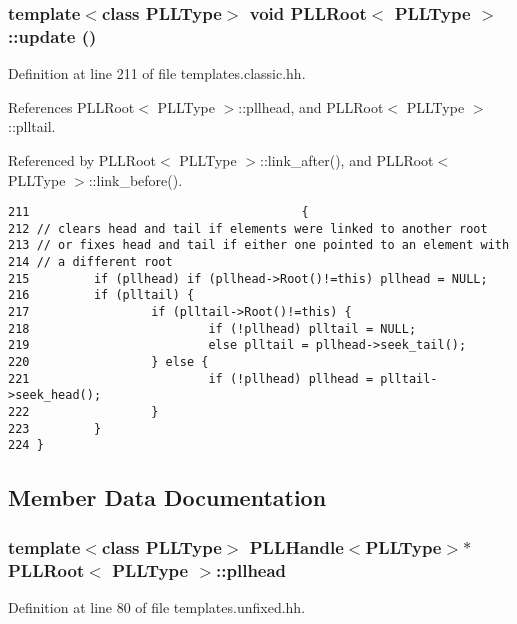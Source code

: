 \subsubsection{\setlength{\rightskip}{0pt plus 5cm}template$<$class PLLType$>$ void PLLRoot$<$ {\bf PLLType} $>$::update ()\hspace{0.3cm}{\tt  [inline]}}\label{classPLLRoot_a7}




Definition at line 211 of file templates.classic.hh.

References PLLRoot$<$ PLLType $>$::pllhead, and PLLRoot$<$ PLLType $>$::plltail.

Referenced by PLLRoot$<$ PLLType $>$::link\_\-after(), and PLLRoot$<$ PLLType $>$::link\_\-before().



\footnotesize\begin{verbatim}211                                      { 
212 // clears head and tail if elements were linked to another root
213 // or fixes head and tail if either one pointed to an element with
214 // a different root
215         if (pllhead) if (pllhead->Root()!=this) pllhead = NULL; 
216         if (plltail) { 
217                 if (plltail->Root()!=this) { 
218                         if (!pllhead) plltail = NULL; 
219                         else plltail = pllhead->seek_tail(); 
220                 } else { 
221                         if (!pllhead) pllhead = plltail->seek_head(); 
222                 } 
223         } 
224 } 
\end{verbatim}\normalsize 


\subsection{Member Data Documentation}
\subsubsection{\setlength{\rightskip}{0pt plus 5cm}template$<$class PLLType$>$ {\bf PLLHandle}$<${\bf PLLType}$>$$\ast$ PLLRoot$<$ {\bf PLLType} $>$::pllhead\hspace{0.3cm}{\tt  [protected]}}\label{classPLLRoot_n6}




Definition at line 80 of file templates.unfixed.hh.
